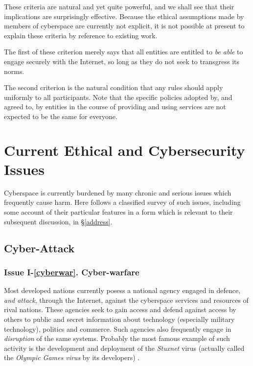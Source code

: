 These criteria are natural and yet quite powerful, and we shall see
that their implications are surprisingly effective. Because the ethical
assumptions made by members of cyberspace are currently not explicit,
it is not possible at present to explain these criteria by reference to
existing work.

The first of these criterion merely says that all entities are entitled to 
{\em be able} to engage securely with the Internet, so long as they do
not seek to transgress its norms.

The second criterion is the natural condition that any rules 
should apply uniformly to all participants. Note that
the specific policies adopted by, and agreed to, by entities in the course of
providing and using services are not expected to be the same for everyone.

\section{Current Ethical and Cybersecurity Issues}\label{issues}

Cyberspace is currently burdened by many chronic and serious issues which
frequently cause harm. 
Here follows a classified survey of such issues,
including some account of their particular features in a form which
is relevant to their subsequent discussion, in \S \ref{address}.

\subsection{Cyber-Attack}\label{cybattk}

\subsubsection*{Issue I-\ref{cyberwar}. {Cyber-warfare}}\label{cyberwarsol}
%
Most developed nations currently posess a national agency
engaged in defence, {\em and attack}, through the Internet,
against the cyberspace services and resources of rival nations.
These agencies seek to gain access and defend against
access by others to public and secret information
about technology (especially military technology),
politics and commerce. 
Such agencies also frequently engage in {\em disruption} of the same systems. Probably
the most famous example of such activity is the development
and deployment of the {\em Stuxnet} virus (actually called the 
{\em Olympic Games virus} by its developers)  \cite{kushner2013real,langner2011stuxnet} .


